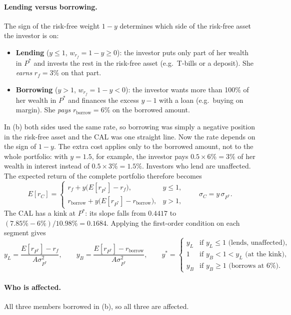 \documentclass[11pt]{article}
\newcommand{\rborrow}{r_{\text{borrow}}}
\begin{document}
\paragraph{Lending versus borrowing.}
The sign of the risk-free weight $1-y$ determines which side of the risk-free asset the investor is on:
\begin{itemize}
  \item \textbf{Lending} ($y \le 1$, $w_{r_f} = 1-y \ge 0$): the investor puts only part of her wealth in $P^*$ and invests the rest in the risk-free asset (e.g.\ T-bills or a deposit). She \emph{earns} $r_f = 3\%$ on that part.
  \item \textbf{Borrowing} ($y > 1$, $w_{r_f} = 1-y < 0$): the investor wants more than 100\% of her wealth in $P^*$ and finances the excess $y-1$ with a loan (e.g.\ buying on margin). She \emph{pays} $\rborrow = 6\%$ on the borrowed amount.
\end{itemize}
In (b) both sides used the same rate, so borrowing was simply a negative position in the risk-free asset and the CAL was one straight line. Now the rate depends on the sign of $1-y$. The extra cost applies only to the borrowed amount, not to the whole portfolio: with $y = 1.5$, for example, the investor pays $0.5 \times 6\% = 3\%$ of her wealth in interest instead of $0.5 \times 3\% = 1.5\%$. Investors who lend are unaffected. The expected return of the complete portfolio therefore becomes
\[
E[r_C] =
\begin{cases}
r_f + y\bigl(E[r_{P^*}] - r_f\bigr), & y \le 1, \\[2pt]
\rborrow + y\bigl(E[r_{P^*}] - \rborrow\bigr), & y > 1,
\end{cases}
\qquad \sigma_C = y\,\sigma_{P^*}.
\]
The CAL has a kink at $P^*$: its slope falls from $0.4417$ to $(7.85\% - 6\%)/10.98\% = 0.1684$. Applying the first-order condition on each segment gives
\[
y_L = \frac{E[r_{P^*}] - r_f}{A\sigma_{P^*}^2}, \qquad
y_B = \frac{E[r_{P^*}] - \rborrow}{A\sigma_{P^*}^2},
\qquad
y^* =
\begin{cases}
y_L & \text{if } y_L \le 1 \text{ (lends, unaffected)}, \\
1   & \text{if } y_B < 1 < y_L \text{ (at the kink)}, \\
y_B & \text{if } y_B \ge 1 \text{ (borrows at 6\%)}.
\end{cases}
\]

\paragraph{Who is affected.}
All three members borrowed in (b), so all three are affected.
\end{document}
